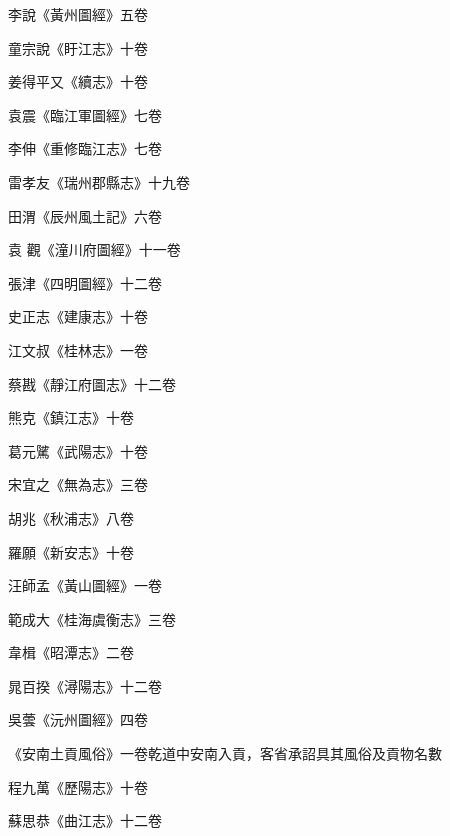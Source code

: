 \begin{pinyinscope}
 李說《黃州圖經》五卷



 童宗說《盱江志》十卷



 姜得平又《續志》十卷



 袁震《臨江軍圖經》七卷



 李伸《重修臨江志》七卷



 雷孝友《瑞州郡縣志》十九卷



 田渭《辰州風土記》六卷



 袁
 觀《潼川府圖經》十一卷



 張津《四明圖經》十二卷



 史正志《建康志》十卷



 江文叔《桂林志》一卷



 蔡戡《靜江府圖志》十二卷



 熊克《鎮江志》十卷



 葛元騭《武陽志》十卷



 宋宜之《無為志》三卷



 胡兆《秋浦志》八卷



 羅願《新安志》十卷



 汪師孟《黃山圖經》一卷



 範成大《桂海虞衡志》三卷



 韋楫《昭潭志》二卷



 晁百揆《潯陽志》十二卷



 吳蕓《沅州圖經》四卷



 《安南土貢風俗》一卷乾道中安南入貢，客省承詔具其風俗及貢物名數



 程九萬《歷陽志》十卷



 蘇思恭《曲江志》十二卷




\end{pinyinscope}
